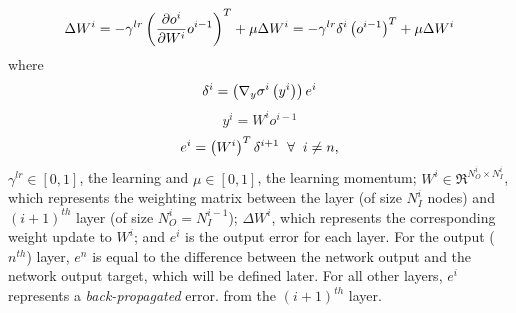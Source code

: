 			\begin{equation}
				\Delta W^{i} =
					-\gamma^{lr} \left( \frac{ \partial o^{i} }{\partial {W^{i} } }  o^{i-1} \right)^{T}  + \mu \Delta W^{i} = 
					-\gamma^{lr} \delta^{i} \left(o^{i-1}\right)^{T}  + \mu \Delta W^{i}
				\label{eq::bp_weight_update}
			\end{equation} 
			where
			\begin{equation*}
				\delta^{i} = \left( \nabla_{y} \sigma^{i}\left(y^{i}\right) \right) e^{i}
				\label{eq::bp_error}
			\end{equation*}
			\begin{equation*}
				y^{i} = W^{i} o^{i-1}
				\label{eq::bp_error}
			\end{equation*}
			\begin{equation*}
				e^{i} =  \left( W^{i} \right)^{T} \delta^{i+1} \hspace{2mm} \forall \hspace{2mm} i\neq n,
			\end{equation*}
			$\gamma^{lr} \in [0,1]$, the learning and  $\mu \in [0,1]$, the learning momentum; $W^{i} \in \Re^{N_{O}^{i}\times N_{I}^{i}}$, which represents the weighting matrix between the \Ith layer (of size $N_{I}^{i}$ nodes) and $(i+1)^{th}$ layer (of size $N_{O}^{i}=N_{I}^{i-1}$); $\Delta W^{i}$, which represents the corresponding weight update to $W^{i}$; and $e^{i}$ is the output error for each \Ith layer. For the output ($n^{th}$) layer, $e^{n}$ is equal to the difference between the network output and the network output target, which will be defined later. For all other layers, $e^{i}$ represents a \emph{back-propagated} error. from the $(i+1)^{th}$ layer.


